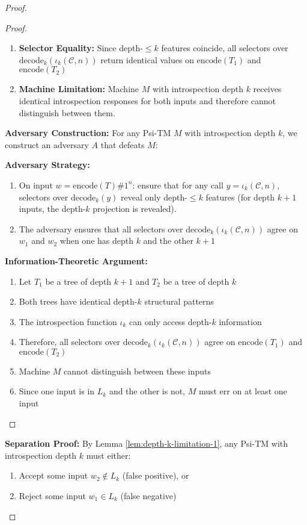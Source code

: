 \begin{proof}
\begin{proof}
\begin{enumerate}
\item \textbf{Selector Equality:}
  Since depth-$\le k$ features coincide, all selectors over $\mathrm{decode}_k(\iota_k(\mathcal{C},n))$ return identical values on $\text{encode}(T_1)$ and $\text{encode}(T_2)$

\item \textbf{Machine Limitation:}
  Machine $M$ with introspection depth $k$ receives identical introspection responses for both inputs and therefore cannot distinguish between them.
\end{enumerate}

\textbf{Adversary Construction:}
For any Psi-TM $M$ with introspection depth $k$, we construct an adversary $A$ that defeats $M$:

\textbf{Adversary Strategy:}
\begin{enumerate}
\item On input $w = \text{encode}(T)\#1^n$:
  ensure that for any call $y=\iota_k(\mathcal{C},n)$, selectors over $\mathrm{decode}_k(y)$ reveal only depth-$\le k$ features (for depth $k{+}1$ inputs, the depth-$k$ projection is revealed).
\item The adversary ensures that all selectors over $\mathrm{decode}_k(\iota_k(\mathcal{C},n))$ agree on $w_1$ and $w_2$ when one has depth $k$ and the other $k{+}1$
\end{enumerate}

\textbf{Information-Theoretic Argument:}
\begin{enumerate}
\item Let $T_1$ be a tree of depth $k+1$ and $T_2$ be a tree of depth $k$
\item Both trees have identical depth-$k$ structural patterns
\item The introspection function $\iota_k$ can only access depth-$k$ information
\item Therefore, all selectors over $\mathrm{decode}_k(\iota_k(\mathcal{C},n))$ agree on $\text{encode}(T_1)$ and $\text{encode}(T_2)$
\item Machine $M$ cannot distinguish between these inputs
\item Since one input is in $L_k$ and the other is not, $M$ must err on at least one input
\end{enumerate}
\end{proof}

\textbf{Separation Proof:}
By Lemma \ref{lem:depth-k-limitation-1}, any Psi-TM with introspection depth $k$ must either:
\begin{enumerate}
\item Accept some input $w_2 \notin L_k$ (false positive), or
\item Reject some input $w_1 \in L_k$ (false negative)
\end{enumerate}


\end{proof}
